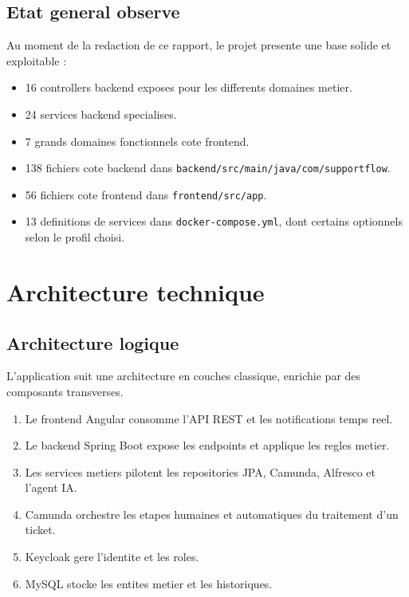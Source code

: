 \documentclass[12pt,a4paper]{article}
\begin{document}
\subsection{Etat general observe}

Au moment de la redaction de ce rapport, le projet presente une base solide et exploitable :

\begin{itemize}[leftmargin=1.2cm]
  \item 16 controllers backend exposes pour les differents domaines metier.
  \item 24 services backend specialises.
  \item 7 grands domaines fonctionnels cote frontend.
  \item 138 fichiers cote backend dans \texttt{backend/src/main/java/com/supportflow}.
  \item 56 fichiers cote frontend dans \texttt{frontend/src/app}.
  \item 13 definitions de services dans \texttt{docker-compose.yml}, dont certains optionnels selon le profil choisi.
\end{itemize}

\section{Architecture technique}

\subsection{Architecture logique}

L'application suit une architecture en couches classique, enrichie par des composants transverses.

\begin{enumerate}[leftmargin=1.2cm]
  \item Le frontend Angular consomme l'API REST et les notifications temps reel.
  \item Le backend Spring Boot expose les endpoints et applique les regles metier.
  \item Les services metiers pilotent les repositories JPA, Camunda, Alfresco et l'agent IA.
  \item Camunda orchestre les etapes humaines et automatiques du traitement d'un ticket.
  \item Keycloak gere l'identite et les roles.
  \item MySQL stocke les entites metier et les historiques.
\end{enumerate}
\end{document}
